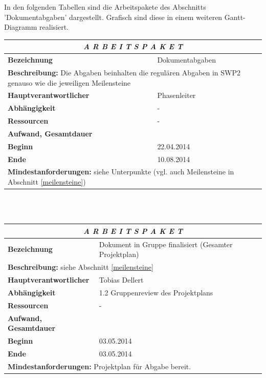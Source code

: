 \documentclass[fontsize=12pt,paper=a4,twoside]{scrartcl}
\begin{document}
In den folgenden Tabellen sind die Arbeitspakete des Abschnitts 'Dokumentabgaben' dargestellt. Grafisch sind diese in einem weiteren Gantt-Diagramm realisiert.

\begin{tabular}{p{7.5cm}|p{7.5cm}}\toprule
\multicolumn{2}{c}{\textbf{\textit{A R B E I T S P A K E T \quad 5}}} \\ \toprule \hline
\textbf{Bezeichnung} & Dokumentabgaben\\\hline
\multicolumn{2}{p{15cm}}{\textbf{Beschreibung:} \newline 
Die Abgaben beinhalten die regulären Abgaben in SWP2 genauso wie die jeweiligen Meilensteine}  \\\hline
\textbf{Hauptverantwortlicher} & Phasenleiter \\\hline
\textbf{Abhängigkeit} & -\\\hline
\textbf{Ressourcen} & -\\\hline
\textbf{Aufwand, Gesamtdauer} & \\\hline
\textbf{Beginn} & 22.04.2014 \\\hline
\textbf{Ende} & 10.08.2014\\\hline
\multicolumn{2}{p{15cm}}{\textbf{Mindestanforderungen: } \newline
siehe Unterpunkte (vgl. auch Meilensteine in Abschnitt \ref{meilensteine})}  \\ \toprule
\end{tabular} \\\\

\begin{tabular}{p{7.5cm}|p{7.5cm}}\toprule
\multicolumn{2}{c}{\textbf{\textit{A R B E I T S P A K E T \quad 5.1}}} \\ \toprule \hline
\textbf{Bezeichnung} & Dokument in Gruppe finalisiert (Gesamter Projektplan)\\\hline
\multicolumn{2}{p{15cm}}{\textbf{Beschreibung:} \newline 
siehe Abschnitt \ref{meilensteine} }  \\\hline
\textbf{Hauptverantwortlicher} & Tobias Dellert \\\hline
\textbf{Abhängigkeit} & 1.2 Gruppenreview des Projektplans\\\hline
\textbf{Ressourcen} & -\\\hline
\textbf{Aufwand, Gesamtdauer} & \\\hline
\textbf{Beginn} & 03.05.2014 \\\hline
\textbf{Ende} & 03.05.2014\\\hline
\multicolumn{2}{p{15cm}}{\textbf{Mindestanforderungen: } \newline
Projektplan für Abgabe bereit.}  \\ \toprule
\end{tabular} \\\\
\end{document}
